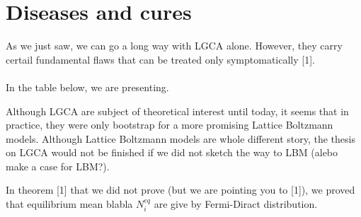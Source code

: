 \chapter{Diseases and cures}

As we just saw, we can go a long way with LGCA alone. However, they carry certail fundamental flaws that can be treated only symptomatically [1].\\
\\
In the table below, we are presenting.

Although LGCA are subject of theoretical interest until today, it seems that in practice, they were only bootstrap for a more promising Lattice Boltzmann models. Although Lattice Boltzmann models are whole different story, the thesis on LGCA would not be finished if we did not sketch the way to LBM (alebo make a case for LBM?).



In theorem [1] that we did not prove (but we are pointing you to [1]),
we proved that equilibrium mean blabla $N_i^{eq}$ are give by Fermi-Diract distribution. 

